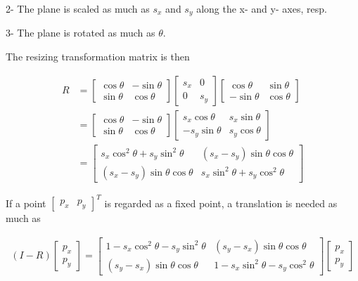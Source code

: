 \documentclass{report}
\newcommand{\eqn}[2]{
\begin{equation}\begin{split}
#1
\label{#2}
\end{split}\end{equation}
}
\begin{document}
2- The plane is scaled as much as $s_x$ and $s_y$ along the x- and y- axes, resp.

3- The plane is rotated as much as $\theta$.

The resizing transformation matrix is then
\eqn{
R&=\begin{bmatrix}
\cos \theta&-\sin\theta\\
\sin \theta&\cos\theta
\end{bmatrix}
\begin{bmatrix}
s_x&0\\0&s_y
\end{bmatrix}
\begin{bmatrix}
\cos \theta&\sin\theta\\
-\sin \theta&\cos\theta
\end{bmatrix}
\\&=
\begin{bmatrix}
\cos \theta&-\sin\theta\\
\sin \theta&\cos\theta
\end{bmatrix}
\begin{bmatrix}
s_x\cos \theta&s_x\sin\theta\\
-s_y\sin \theta&s_y\cos\theta
\end{bmatrix}
\\&=
\begin{bmatrix}
s_x\cos^2 \theta+s_y\sin^2\theta&(s_x-s_y)\sin\theta\cos\theta\\
(s_x-s_y)\sin\theta\cos\theta&s_x\sin^2 \theta+s_y\cos^2\theta
\end{bmatrix}
}{}

If a point $\begin{bmatrix}p_x&p_y\end{bmatrix}^T$ is regarded as a fixed point, a translation is needed as much as
\eqn{
(I-R)\begin{bmatrix}p_x\\p_y\end{bmatrix}=
\begin{bmatrix}
1-s_x\cos^2 \theta-s_y\sin^2\theta&(s_y-s_x)\sin\theta\cos\theta\\
(s_y-s_x)\sin\theta\cos\theta&1-s_x\sin^2 \theta-s_y\cos^2\theta
\end{bmatrix}
\begin{bmatrix}p_x\\p_y\end{bmatrix}
}{}
\end{document}
